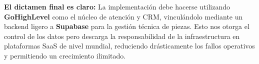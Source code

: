 \documentclass[12pt,a4paper]{article}
\begin{document}
\textbf{El dictamen final es claro:} La implementación debe hacerse utilizando \textbf{GoHighLevel} como el núcleo de atención y CRM, vinculándolo mediante un backend ligero a \textbf{Supabase} para la gesti\'on t\'ecnica de piezas. Esto nos otorga el control de los datos pero descarga la responsabilidad de la infraestructura en plataformas SaaS de nivel mundial, reduciendo drásticamente los fallos operativos y permitiendo un crecimiento ilimitado.
\end{document}
